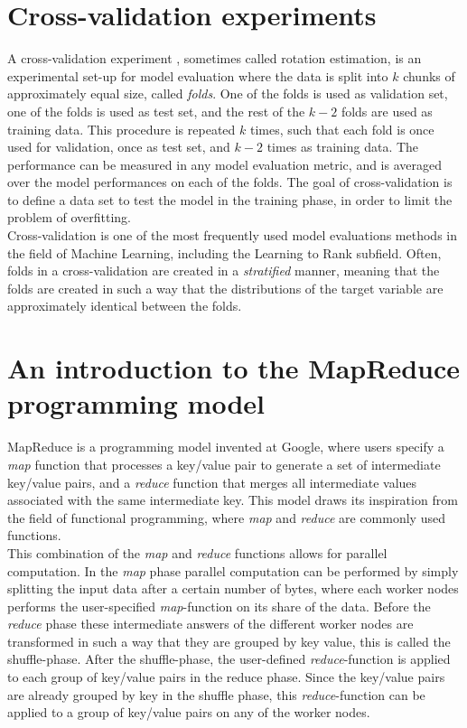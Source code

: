 \section{Cross-validation experiments}
\label{sec:cross_validation}
A cross-validation experiment \cite{kohavi1995}, sometimes called rotation estimation, is an experimental set-up for model evaluation where the data is split into $k$ chunks of approximately equal size, called \emph{folds}. One of the folds is used as validation set, one of the folds is used as test set, and the rest of the $k - 2$ folds are used as training data. This procedure is repeated $k$ times, such that each fold is once used for validation, once as test set, and $k - 2$ times as training data. The performance can be measured in any model evaluation metric, and is averaged over the model performances on each of the folds. The goal of cross-validation is to define a data set to test the model in the training phase, in order to limit the problem of overfitting.\\

Cross-validation is one of the most frequently used model evaluations methods in the field of Machine Learning, including the Learning to Rank subfield. Often, folds in a cross-validation are created in a \emph{stratified} manner, meaning that the folds are created in such a way that the distributions of the target variable are approximately identical between the folds.

\section{An introduction to the MapReduce programming model}
MapReduce \cite{Dean2004} is a programming model invented at Google, where users specify a \emph{map} function that processes a key/value pair to generate a set of intermediate key/value pairs, and a \emph{reduce} function that merges all intermediate values associated with the same intermediate key. This model draws its inspiration from the field of functional programming, where \emph{map} and \emph{reduce} are commonly used functions.\\

This combination of the \emph{map} and \emph{reduce} functions allows for parallel computation. In the \emph{map} phase parallel computation can be performed by simply splitting the input data after a certain number of bytes, where each worker nodes performs the user-specified \emph{map}-function on its share of the data. Before the \emph{reduce} phase these intermediate answers of the different worker nodes are transformed in such a way that they are grouped by key value, this is called the shuffle-phase. After the shuffle-phase, the user-defined \emph{reduce}-function is applied to each group of key/value pairs in the reduce phase. Since the key/value pairs are already grouped by key in the shuffle phase, this \emph{reduce}-function can be applied to a group of key/value pairs on any of the worker nodes.\\